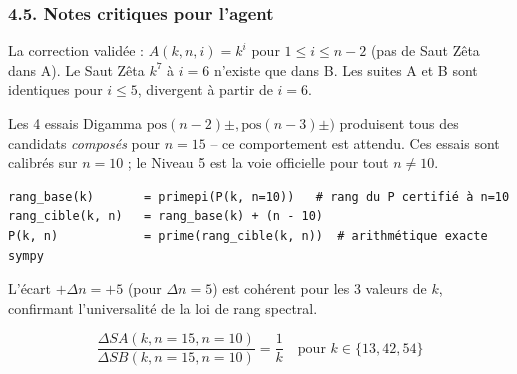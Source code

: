 \documentclass[11pt,a4paper]{article}
\begin{document}
\vspace{0.5cm}


\subsubsection*{4.5. Notes critiques pour l'agent}

\begin{boitenote}
La correction validée : $A(k, n, i) = k^{i}$ pour $1 \leq i \leq n-2$ (pas de Saut Zêta dans A). Le Saut Zêta $k^{7}$ à $i=6$ n'existe que dans B. Les suites A et B sont identiques pour $i \leq 5$, divergent à partir de $i=6$.
\end{boitenote}


\vspace{0.3cm}

\begin{boitenote}
Les 4 essais Digamma $\text{pos}(n-2)\pm, \text{pos}(n-3)\pm)$ produisent tous des candidats \emph{composés} pour $n=15$ -- ce comportement est attendu. Ces essais sont calibrés sur $n=10$ ; le Niveau 5 est la voie officielle pour tout $n \neq 10$.
\end{boitenote}


\vspace{0.3cm}

\begin{boitenote}
\begin{verbatim}
rang_base(k)       = primepi(P(k, n=10))   # rang du P certifié à n=10
rang_cible(k, n)   = rang_base(k) + (n - 10)
P(k, n)            = prime(rang_cible(k, n))  # arithmétique exacte sympy
\end{verbatim}
L'écart $+\Delta n = +5$ (pour $\Delta n = 5$) est cohérent pour les 3 valeurs de $k$, confirmant l'universalité de la loi de rang spectral.
\end{boitenote}


\vspace{0.3cm}

\begin{boitenote}
$$\frac{\Delta SA(k, n=15, n=10)}{\Delta SB(k, n=15, n=10)} = \frac{1}{k} \quad \text{pour } k \in \{13, 42, 54\}$$
\end{boitenote}


\vspace{0.3cm}
\end{document}
